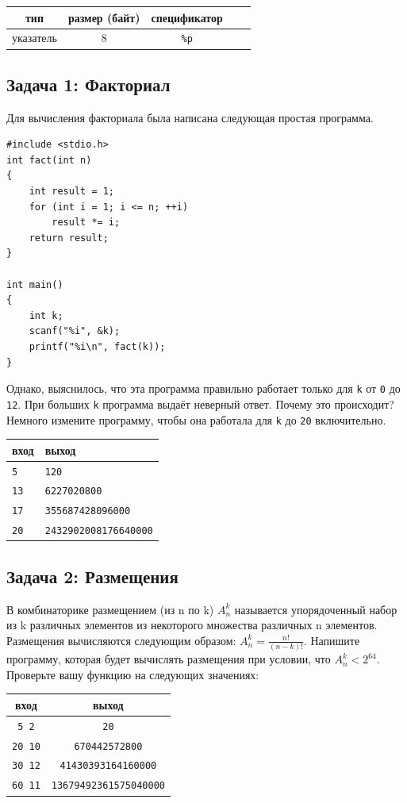 \documentclass{article}
\begin{document}
\begin{center}
\begin{tabular}{ c c c c c }
 тип & размер (байт)  & спецификатор \\ \hline
 указатель             & 8           & \texttt{\%p} \\ 
\end{tabular}
\end{center}


\subsection*{Задача 1: Факториал}
Для вычисления факториала была написана следующая простая программа. 
\begin{lstlisting}
#include <stdio.h>
int fact(int n) 
{
    int result = 1;
    for (int i = 1; i <= n; ++i)
        result *= i;
    return result;
}

int main() 
{
    int k;
    scanf("%i", &k);
    printf("%i\n", fact(k));
}
\end{lstlisting}
Однако, выяснилось, что эта программа правильно работает только для \texttt{k} от \texttt{0} до \texttt{12}. При больших \texttt{k} программа выдаёт неверный ответ. Почему это происходит?
Немного измените программу, чтобы она работала для \texttt{k} до \texttt{20} включительно.

\begin{center}
\begin{tabular}{ l l }
 вход & выход \\ \hline
 \texttt{5} & \texttt{120}  \\ 
 \texttt{13} & \texttt{6227020800} \\
 \texttt{17} & \texttt{355687428096000} \\
 \texttt{20} & \texttt{2432902008176640000} \\
\end{tabular}
\end{center}


\subsection*{Задача 2: Размещения}
В комбинаторике размещением (из n по k) $A_n^k$ называется упорядоченный набор из k различных элементов из некоторого множества различных n элементов. Размещения вычисляются следующим образом: $A_n^k = \frac{n!}{(n-k)!}$. Напишите программу, которая будет вычислять размещения при условии, что  $A_n^k < 2^{64}$. Проверьте вашу функцию на следующих значениях:
\begin{center}
\begin{tabular}{ c c }
 вход & выход \\ \hline
 \texttt{5 2} & \texttt{20}  \\ 
 \texttt{20 10} & \texttt{670442572800}  \\ 
 \texttt{30 12} & \texttt{41430393164160000} \\ 
 \texttt{60 11} & \texttt{13679492361575040000} \\   
\end{tabular}
\end{center}
\end{document}
